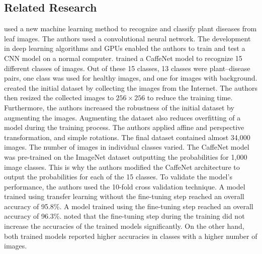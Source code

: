 \documentclass{BachelorBUI}
\begin{document}

    \subsection{Related Research}

        \textcite{Sladojevic:2016} used a new machine learning method to recognize and classify plant diseases from leaf images. The authors used a convolutional neural network. The development in deep learning algorithms and GPUs enabled the authors to train and test a CNN model on a normal computer. \textcite{Sladojevic:2016} trained a CaffeNet model to recognize 15 different classes of images. Out of these 15 classes, 13 classes were plant--disease pairs, one class was used for healthy images, and one for images with background. \textcite{Sladojevic:2016} created the initial dataset by collecting the images from the Internet. The authors then resized the collected images to $256 \times 256$ to reduce the training time. Furthermore, the authors increased the robustness of the initial dataset by augmenting the images. Augmenting the dataset also reduces overfitting of a model during the training process. The authors applied affine and perspective transformation, and simple rotations. The final dataset contained almost 34,000 images. The number of images in individual classes varied. The CaffeNet model was pre-trained on the ImageNet dataset outputting the probabilities for 1,000 image classes. This is why the authors modified the CaffeNet architecture to output the probabilities for each of the 15 classes. To validate the model's performance, the authors used the 10-fold cross validation technique. A model trained using transfer learning without the fine-tuning step reached an overall accuracy of 95.8\%. A model trained using the fine-tuning step reached an overall accuracy of 96.3\%. \textcite{Sladojevic:2016} noted that the fine-tuning step during the training did not increase the accuracies of the trained models significantly. On the other hand, both trained models reported higher accuracies in classes with a higher number of images. 
    
\end{document}
